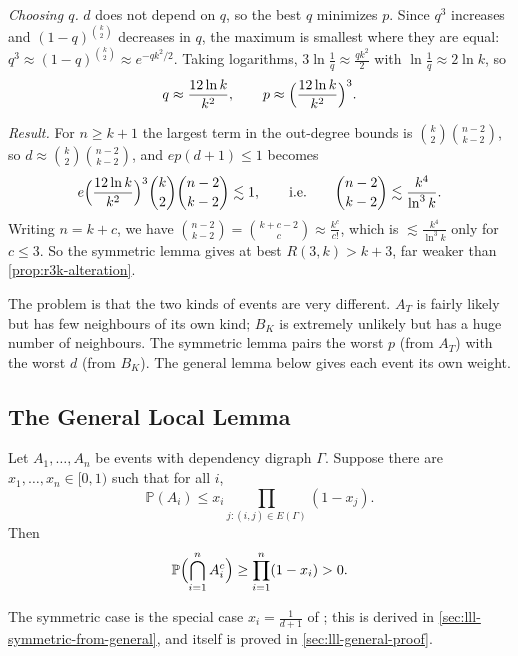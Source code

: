 \emph{Choosing \(q\).} \(d\) does not depend on \(q\), so the best \(q\) minimizes \(p\). Since \(q^{3}\) increases and \((1-q)^{\binom{k}{2}}\) decreases in \(q\), the maximum is smallest where they are equal: \(q^{3} \approx (1-q)^{\binom{k}{2}} \approx e^{-q k^{2}/2}\). Taking logarithms, \(3 \ln \frac{1}{q} \approx \frac{q k^{2}}{2}\) with \(\ln \frac{1}{q} \approx 2 \ln k\), so
\[
    q \approx \frac{12 \ln k}{k^{2}}, \qquad p \approx \Bigl( \frac{12 \ln k}{k^{2}} \Bigr)^{3} .
\]

\emph{Result.} For \(n \ge k + 1\) the largest term in the out-degree bounds is \(\binom{k}{2} \binom{n-2}{k-2}\), so \(d \approx \binom{k}{2} \binom{n-2}{k-2}\), and \(e p (d+1) \le 1\) becomes
\[
    e \Bigl( \frac{12 \ln k}{k^{2}} \Bigr)^{3} \binom{k}{2} \binom{n-2}{k-2} \lesssim 1 ,
    \qquad\text{i.e.}\qquad
    \binom{n-2}{k-2} \lesssim \frac{k^{4}}{\ln^{3} k} .
\]
Writing \(n = k + c\), we have \(\binom{n-2}{k-2} = \binom{k+c-2}{c} \approx \frac{k^{c}}{c!}\), which is \(\lesssim \frac{k^{4}}{\ln^{3} k}\) only for \(c \le 3\). So the symmetric lemma gives at best \(R(3,k) > k + 3\), far weaker than \autoref{prop:r3k-alteration}.

The problem is that the two kinds of events are very different. \(A_{T}\) is fairly likely but has few neighbours of its own kind; \(B_{K}\) is extremely unlikely but has a huge number of neighbours. The symmetric lemma pairs the worst \(p\) (from \(A_{T}\)) with the worst \(d\) (from \(B_{K}\)). The general lemma below gives each event its own weight.

\subsection{The General Local Lemma}\label{sec:lll-general}

\begin{theorem}\label{thm:lll-general}
    Let \(A_{1}, \ldots, A_{n}\) be events with dependency digraph \(\Gamma\). Suppose there are \(x_{1}, \ldots, x_{n} \in [0,1)\) such that for all \(i\),
    \begin{equation}\label{eq:lll-general-condition}
        \mathbb{P}(A_{i}) \le x_{i} \prod_{j : (i,j) \in E(\Gamma)} (1 - x_{j}) .
    \end{equation}
    Then
    \[
        \mathbb{P}\Bigl( \bigcap_{i=1}^{n} A_{i}^{c} \Bigr) \ge \prod_{i=1}^{n} (1 - x_{i}) > 0 .
    \]
\end{theorem}

The symmetric case  is the special case \(x_{i} = \frac{1}{d+1}\) of ; this is derived in \autoref{sec:lll-symmetric-from-general}, and  itself is proved in \autoref{sec:lll-general-proof}.

